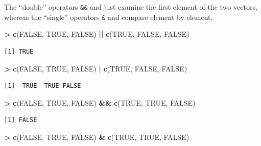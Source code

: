 \documentclass[
]{krantz}
\makeatletter
\newenvironment{Shaded}{\begin{snugshade}}{\end{snugshade}}
\newcommand{\KeywordTok}[1]{\textcolor[rgb]{0.27,0.27,0.27}{\textbf{#1}}}
\newcommand{\NormalTok}[1]{#1}
\newcommand{\OperatorTok}[1]{\textcolor[rgb]{0.43,0.43,0.43}{\textbf{#1}}}
\newcommand{\OtherTok}[1]{\textcolor[rgb]{0.37,0.37,0.37}{#1}}
\newcommand{\StringTok}[1]{\textcolor[rgb]{0.5,0.5,0.5}{#1}}
\newenvironment{kframe}{%
\medskip{}
\setlength{\fboxsep}{.8em}
 \def\at@end@of@kframe{}%
 \ifinner\ifhmode%
  \def\at@end@of@kframe{\end{minipage}}%
  \begin{minipage}{\columnwidth}%
 \fi\fi%
 \def\FrameCommand##1{\hskip\@totalleftmargin \hskip-\fboxsep
 \colorbox{shadecolor}{##1}\hskip-\fboxsep
     \hskip-\linewidth \hskip-\@totalleftmargin \hskip\columnwidth}%
 \MakeFramed {\advance\hsize-\width
   \@totalleftmargin\z@ \linewidth\hsize
   \@setminipage}}%
 {\par\unskip\endMakeFramed%
 \at@end@of@kframe}
\renewenvironment{Shaded}{\begin{kframe}}{\end{kframe}}
\makeatother
\begin{document}
The ``double'' operators \texttt{\&\&} and \texttt{\textbar{}\textbar{}} just examine the first element of the two vectors, whereas the ``single'' operators \texttt{\&} and \texttt{\textbar{}} compare element by element.

\begin{Shaded}
\begin{Highlighting}[]
\OperatorTok{\textgreater{}}\StringTok{ }\KeywordTok{c}\NormalTok{(}\OtherTok{FALSE}\NormalTok{, }\OtherTok{TRUE}\NormalTok{, }\OtherTok{FALSE}\NormalTok{) }\OperatorTok{||}\StringTok{ }\KeywordTok{c}\NormalTok{(}\OtherTok{TRUE}\NormalTok{, }\OtherTok{FALSE}\NormalTok{, }\OtherTok{FALSE}\NormalTok{)}
\end{Highlighting}
\end{Shaded}

\begin{verbatim}
[1] TRUE
\end{verbatim}

\begin{Shaded}
\begin{Highlighting}[]
\OperatorTok{\textgreater{}}\StringTok{ }\KeywordTok{c}\NormalTok{(}\OtherTok{FALSE}\NormalTok{, }\OtherTok{TRUE}\NormalTok{, }\OtherTok{FALSE}\NormalTok{) }\OperatorTok{|}\StringTok{ }\KeywordTok{c}\NormalTok{(}\OtherTok{TRUE}\NormalTok{, }\OtherTok{FALSE}\NormalTok{, }\OtherTok{FALSE}\NormalTok{)}
\end{Highlighting}
\end{Shaded}

\begin{verbatim}
[1]  TRUE  TRUE FALSE
\end{verbatim}

\begin{Shaded}
\begin{Highlighting}[]
\OperatorTok{\textgreater{}}\StringTok{ }\KeywordTok{c}\NormalTok{(}\OtherTok{FALSE}\NormalTok{, }\OtherTok{TRUE}\NormalTok{, }\OtherTok{FALSE}\NormalTok{) }\OperatorTok{\&\&}\StringTok{ }\KeywordTok{c}\NormalTok{(}\OtherTok{TRUE}\NormalTok{, }\OtherTok{TRUE}\NormalTok{, }\OtherTok{FALSE}\NormalTok{)}
\end{Highlighting}
\end{Shaded}

\begin{verbatim}
[1] FALSE
\end{verbatim}

\begin{Shaded}
\begin{Highlighting}[]
\OperatorTok{\textgreater{}}\StringTok{ }\KeywordTok{c}\NormalTok{(}\OtherTok{FALSE}\NormalTok{, }\OtherTok{TRUE}\NormalTok{, }\OtherTok{FALSE}\NormalTok{) }\OperatorTok{\&}\StringTok{ }\KeywordTok{c}\NormalTok{(}\OtherTok{TRUE}\NormalTok{, }\OtherTok{TRUE}\NormalTok{, }\OtherTok{FALSE}\NormalTok{)}
\end{Highlighting}
\end{Shaded}
\end{document}
